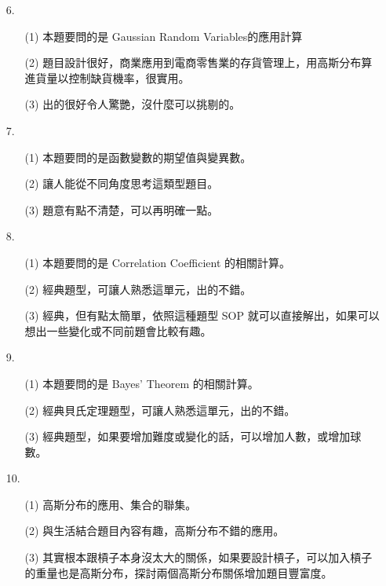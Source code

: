 \documentclass{article}
\begin{document}
\begin{enumerate}
    \item [6.]
    \begin{enumerate}
        \item [(1)]	本題要問的是 Gaussian Random Variables的應用計算
        \item [(2)]	題目設計很好，商業應用到電商零售業的存貨管理上，用高斯分布算進貨量以控制缺貨機率，很實用。
        \item [(3)]	出的很好令人驚艷，沒什麼可以挑剔的。
    \end{enumerate}

    \item [7.]
    \begin{enumerate}
        \item [(1)]	本題要問的是函數變數的期望值與變異數。
        \item [(2)]	讓人能從不同角度思考這類型題目。
        \item [(3)]	題意有點不清楚，可以再明確一點。        
    \end{enumerate}

    \item [8.]
    \begin{enumerate}
        \item [(1)]	本題要問的是 Correlation Coefficient 的相關計算。
        \item [(2)]	經典題型，可讓人熟悉這單元，出的不錯。
        \item [(3)]	經典，但有點太簡單，依照這種題型 SOP 就可以直接解出，如果可以想出一些變化或不同前題會比較有趣。
    \end{enumerate}

    \item [9.]
    \begin{enumerate}
        \item [(1)]	本題要問的是 Bayes' Theorem 的相關計算。
        \item [(2)]	經典貝氏定理題型，可讓人熟悉這單元，出的不錯。
        \item [(3)]	經典題型，如果要增加難度或變化的話，可以增加人數，或增加球數。
    \end{enumerate}

    \item [10.]
    \begin{enumerate}
        \item [(1)] 高斯分布的應用、集合的聯集。
        \item [(2)] 與生活結合題目內容有趣，高斯分布不錯的應用。
        \item [(3)] 其實根本跟槓子本身沒太大的關係，如果要設計槓子，可以加入槓子的重量也是高斯分布，探討兩個高斯分布關係增加題目豐富度。
    \end{enumerate}


\end{enumerate}
\end{document}
